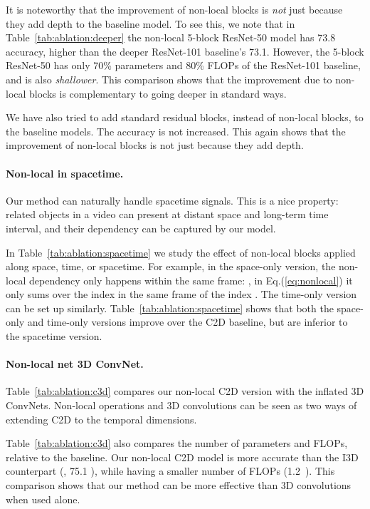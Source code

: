 \documentclass[10pt,twocolumn,letterpaper]{article}
\def\x{}
\begin{document}
It is noteworthy that the improvement of non-local blocks is \emph{not} just because they add depth to the baseline model. To see this, we note that in Table~\ref{tab:ablation:deeper} the non-local 5-block ResNet-50 model has 73.8 accuracy, higher than the deeper ResNet-101 baseline's 73.1. However, the 5-block ResNet-50 has only 70\% parameters and 80\% FLOPs of the ResNet-101 baseline, and is also \emph{shallower}. This comparison shows that the improvement due to non-local blocks is complementary to going deeper in standard ways.

We have also tried to add standard residual blocks, instead of non-local blocks, to the baseline models. The accuracy is not increased. This again shows that the improvement of non-local blocks is not just because they add depth.

\paragraph{Non-local in spacetime.} Our method can naturally handle spacetime signals. This is a nice property: related objects in a video can present at distant space and long-term time interval, and their dependency can be captured by our model.

In Table~\ref{tab:ablation:spacetime} we study the effect of non-local blocks applied along space, time, or spacetime. For example, in the space-only version, the non-local dependency only happens within the same frame: \ie, in Eq.(\ref{eq:nonlocal}) it only sums over the index  in the same frame of the index . The time-only version can be set up similarly. Table~\ref{tab:ablation:spacetime} shows that both the space-only and time-only versions improve over the C2D baseline, but are inferior to the spacetime version.

\paragraph{Non-local net \vs 3D ConvNet.} Table~\ref{tab:ablation:c3d} compares our non-local C2D version with the inflated 3D ConvNets. Non-local operations and 3D convolutions can be seen as two ways of extending C2D to the temporal dimensions.

Table~\ref{tab:ablation:c3d} also compares the number of parameters and FLOPs, relative to the baseline. Our non-local C2D model is more accurate than the I3D counterpart (\eg, 75.1 ), while having a smaller number of FLOPs (1.2\x~\x). This comparison shows that our method can be more effective than 3D convolutions when used alone.
\end{document}
